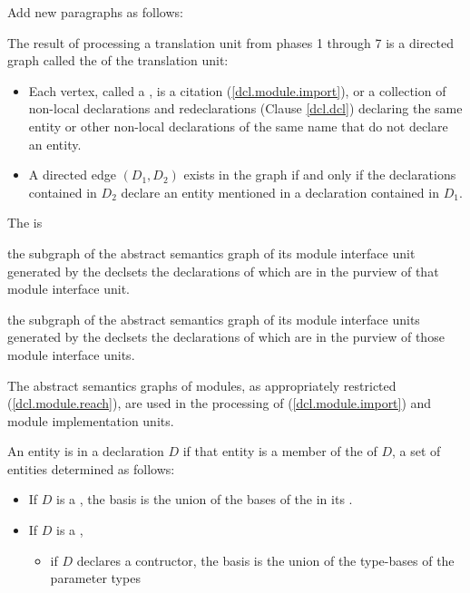 \begin{undecided}
Add new paragraphs as follows:
\begin{std.txt}\color{addclr}
    \resetalinea[1]
    \alinea
    The result of processing a translation unit from phases 1 through 7
    is a directed graph called the  of
    the translation unit:
    \begin{itemize}
        \item Each vertex, called a , is
            a citation (\ref{dcl.module.import}), or a collection of 
            non-local declarations and redeclarations (Clause \ref{dcl.dcl})
            declaring the same entity or other non-local declarations
            of the same name that do not declare an entity.
        \item A directed edge $(D_1, D_2)$ exists in the graph if and only if the 
        declarations contained in $D_2$ declare an entity mentioned 
        in a declaration contained in $D_1$.
    \end{itemize}
    The  is
    \begin{before}\color{addclr}
    the subgraph of
    the abstract semantics graph of its module interface unit generated
    by the declsets the declarations of which are
    in the purview of that module interface unit.
    \end{before}
    \begin{after}\color{addclr}
    the subgraph of
    the abstract semantics graph of its module interface units generated
    by the declsets the declarations of which are
    in the purview of those module interface units.
    \end{after}
    \enternote
    The abstract semantics graphs of modules,
    as appropriately restricted (\ref{dcl.module.reach}), are used in
    the processing of 
    (\ref{dcl.module.import}) and module implementation units.
    \exitnote

  \alinea
  An entity is  in a declaration $D$ if that entity is a member of the
   of $D$, a set of entities determined as follows:
  \begin{itemize}
    \item If $D$ is a , the basis is the union
    of the bases of the  in its
    .

    \item If $D$ is a ,
    \begin{itemize}
        \item if $D$ declares a contructor, the basis is
        the union of the type-bases of the parameter types


\end{itemize}
\end{itemize}
\end{std.txt}
\end{undecided}
